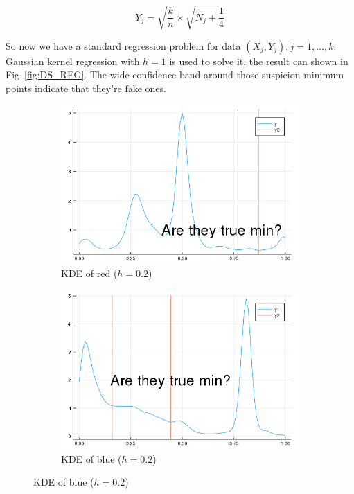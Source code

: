 \documentclass{article}
\begin{document}
$$
Y_j = \sqrt{\frac{k}{n}} \times \sqrt{N_j+\frac{1}{4}}
$$

So now we have a standard regression problem for data $(X_j,Y_j),j=1,\dots,k$.
Gaussian kernel regression with $h=1$ is used to solve it, the result can shown in Fig~\ref{fig:DS_REG}.
The wide confidence band around those suspicion minimum points indicate that they're fake ones.
 
\begin{figure}[htb]
  \centering
  \begin{subfigure}[b]{0.24\linewidth}
    \includegraphics[width=\linewidth]{images/fake_min_r.png}
    \caption{KDE of red ($h=0.2$)}
  \end{subfigure}
  \begin{subfigure}[b]{0.24\linewidth}
    \includegraphics[width=\linewidth]{images/fake_min_b.png}
    \caption{KDE of blue ($h=0.2$)}
  \end{subfigure}

\end{figure}
\end{document}
